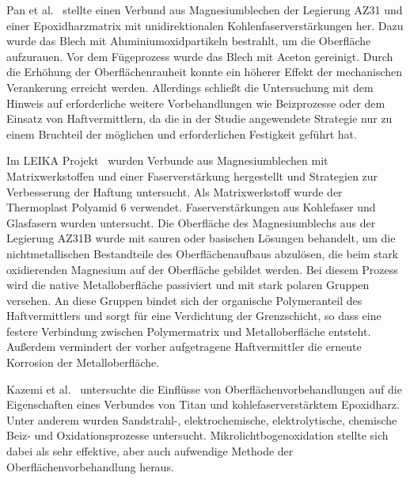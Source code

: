 Pan et al.~\cite{Pan2016} stellte einen Verbund aus Magnesiumblechen der Legierung AZ31 und einer Epoxidharzmatrix mit unidirektionalen Kohlenfaserverstärkungen her.
Dazu wurde das Blech mit Aluminiumoxidpartikeln bestrahlt, um die Oberfläche aufzurauen.
Vor dem Fügeprozess wurde das Blech mit Aceton gereinigt.
Durch die Erhöhung der Oberflächenrauheit konnte ein höherer Effekt der mechanischen Verankerung erreicht werden.
Allerdings schließt die Untersuchung mit dem Hinweis auf erforderliche weitere Vorbehandlungen wie Beizprozesse oder dem Einsatz von Haftvermittlern, da die in der Studie angewendete Strategie nur zu einem Bruchteil der möglichen und erforderlichen Festigkeit geführt hat.

Im LEIKA Projekt~\cite{Wiedemann2017} wurden Verbunde aus Magnesiumblechen mit Matrixwerkstoffen und einer Faserverstärkung hergestellt und Strategien zur Verbesserung der Haftung untersucht.
Als Matrixwerkstoff wurde der Thermoplast Polyamid 6 verwendet.
Faserverstärkungen aus Kohlefaser und Glasfasern wurden untersucht.
Die Oberfläche des Magnesiumblechs aus der Legierung AZ31B wurde mit sauren oder basischen Lösungen behandelt, um die nichtmetallischen Bestandteile des Oberflächenaufbaus abzulösen, die beim stark oxidierenden Magnesium auf der Oberfläche gebildet werden.
Bei diesem Prozess wird die native Metalloberfläche passiviert und mit stark polaren Gruppen versehen.
An diese Gruppen bindet sich der organische Polymeranteil des Haftvermittlers und sorgt für eine Verdichtung der Grenzschicht, so dass eine festere Verbindung zwischen Polymermatrix und Metalloberfläche entsteht.
Außerdem vermindert der vorher aufgetragene Haftvermittler die erneute Korrosion der Metalloberfläche.

Kazemi et al.~\cite{Kazemi2020} untersuchte die Einflüsse von Oberflächenvorbehandlungen auf die Eigenschaften eines Verbundes von Titan und kohlefaserverstärktem Epoxidharz.
Unter anderem wurden Sandstrahl-, elektrochemische, elektrolytische, chemische Beiz- und Oxidationsprozesse untersucht.
Mikrolichtbogenoxidation stellte sich dabei als sehr effektive, aber auch aufwendige Methode der Oberflächenvorbehandlung heraus.

